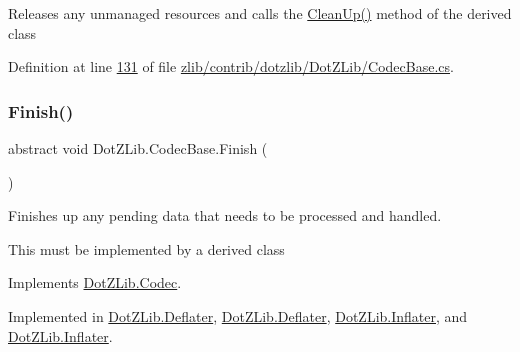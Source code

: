 Releases any unmanaged resources and calls the \hyperlink{class_dot_z_lib_1_1_codec_base_aa0ded075105c5cf6f5f0d61928c90ca6}{Clean\+Up()} method of the derived class 



Definition at line \hyperlink{zlib_2contrib_2dotzlib_2_dot_z_lib_2_codec_base_8cs_source_l00131}{131} of file \hyperlink{zlib_2contrib_2dotzlib_2_dot_z_lib_2_codec_base_8cs_source}{zlib/contrib/dotzlib/\+Dot\+Z\+Lib/\+Codec\+Base.\+cs}.

\mbox{\label{class_dot_z_lib_1_1_codec_base_abab96cb01a9b983452a31777e3a1e633}} 
\subsubsection{\texorpdfstring{Finish()}{Finish()}\hspace{0.1cm}{\footnotesize\ttfamily [1/2]}}
{\footnotesize\ttfamily abstract void Dot\+Z\+Lib.\+Codec\+Base.\+Finish (\begin{DoxyParamCaption}{ }\end{DoxyParamCaption})\hspace{0.3cm}{\ttfamily [pure virtual]}}



Finishes up any pending data that needs to be processed and handled. 

This must be implemented by a derived class

Implements \hyperlink{interface_dot_z_lib_1_1_codec_af12b887d445dcbc5e7c11b3aa000aa27}{Dot\+Z\+Lib.\+Codec}.



Implemented in \hyperlink{class_dot_z_lib_1_1_deflater_a84507769a20a13c2ff48cfcef8f5c13b}{Dot\+Z\+Lib.\+Deflater}, \hyperlink{class_dot_z_lib_1_1_deflater_a84507769a20a13c2ff48cfcef8f5c13b}{Dot\+Z\+Lib.\+Deflater}, \hyperlink{class_dot_z_lib_1_1_inflater_aa70c9d026f5d1b44fe0679b78973285c}{Dot\+Z\+Lib.\+Inflater}, and \hyperlink{class_dot_z_lib_1_1_inflater_aa70c9d026f5d1b44fe0679b78973285c}{Dot\+Z\+Lib.\+Inflater}.

\mbox{\label{class_dot_z_lib_1_1_codec_base_abab96cb01a9b983452a31777e3a1e633}} 
